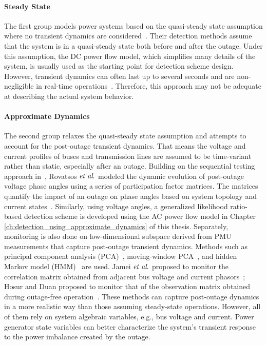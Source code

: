 \paragraph{Steady State}
The first group models power systems based on the quasi-steady state assumption where no transient dynamics are considered~\cite{Tate2008, tate2009double, babakmehr2015application,Chen2016, ardakanian2017event,Ardakanian2019a}. Their detection methods assume that the system is in a quasi-steady state both before and after the outage. Under this assumption, the DC power flow model, which simplifies many details of the system, is usually used as the starting point for detection scheme design. However, transient dynamics can often last up to several seconds and are non-negligible in real-time operations~\cite{Glover2012}. Therefore, this approach may not be adequate at describing the actual system behavior. 

\paragraph{Approximate Dynamics}
The second group relaxes the quasi-steady state assumption and attempts to account for the post-outage transient dynamics. That means the voltage and current profiles of buses and transmission lines are assumed to be time-variant rather than static, especially after an outage.
Building on the sequential testing approach in~\cite{Chen2016}, Rovatsos $\textit{et al}.$ modeled the dynamic evolution of post-outage voltage phase angles using a series of participation factor matrices. The matrices quantify the impact of an outage on phase angles based on system topology and current states~\cite{Rovatsos2017}. 
Similarly, using voltage angles, a generalized likelihood ratio-based detection scheme is developed using the AC power flow model in Chapter \ref{ch:detection_using_approximate_dynamics} of this thesis. 
Separately, monitoring is also done on low-dimensional subspace derived from PMU measurements that capture post-outage transient dynamics. Methods such as principal component analysis (PCA)~\cite{Xie2014}, moving-window PCA~\cite{Rafferty2016}, and hidden Markov model (HMM)~\cite{Huang2016b} are used. Jamei $\textit{et al}.$ proposed to monitor the correlation matrix obtained from adjacent bus voltage and current phasors~\cite{Jamei2017a}; Hosur and Duan proposed to monitor that of the observation matrix obtained during outage-free operation~\cite{Hosur2019}. These methods can capture post-outage dynamics in a more realistic way than those assuming steady-state operations. However, all of them rely on system algebraic variables, e.g., bus voltage and current. Power generator state variables can better characterize the system's transient response to the power imbalance created by the outage.

